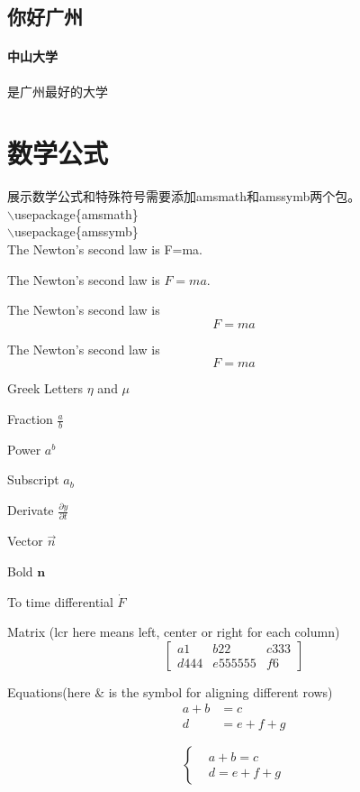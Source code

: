 \documentclass{ctexart}
\begin{document}
        \subsection{你好广州}
        \paragraph{中山大学}是广州最好的大学\cite{LaTeX新人教程}

    \section{数学公式}
展示数学公式和特殊符号需要添加amsmath和amssymb两个包。   \\ 
$\backslash$usepackage\{amsmath\} \\
$\backslash$usepackage\{amssymb\} \\

The Newton's second law is F=ma.

The Newton's second law is $F=ma$.

The Newton's second law is
$$F=ma$$

The Newton's second law is
\[F=ma\]

Greek Letters $\eta$ and $\mu$

Fraction $\frac{a}{b}$

Power $a^b$

Subscript $a_b$

Derivate $\frac{\partial y}{\partial t} $

Vector $\vec{n}$

Bold $\mathbf{n}$

To time differential $\dot{F}$

Matrix (lcr here means left, center or right for each column)
\[
\left[
\begin{array}{lcr}
a1 & b22 & c333 \\
d444 & e555555 & f6
\end{array}
\right]
\]

Equations(here \& is the symbol for aligning different rows)
\begin{align}
a+b&=c\\
d&=e+f+g
\end{align}

\[
\left\{
\begin{aligned}
&a+b=c\\
&d=e+f+g
\end{aligned}
\right.
\]
\end{document}

